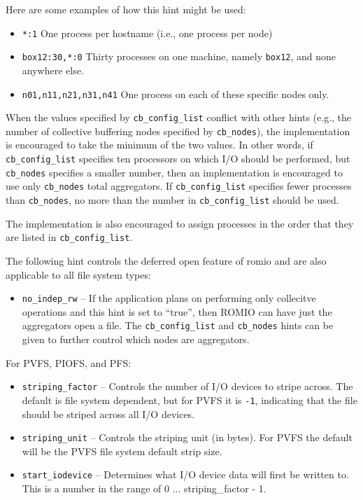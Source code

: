 Here are some examples of how this hint might be used:
\begin{itemize}
\item \texttt{*:1} One process per hostname (i.e., one process per node)
\item \texttt{box12:30,*:0} Thirty processes on one machine, namely
      \texttt{box12}, and none anywhere else.
\item \texttt{n01,n11,n21,n31,n41} One process on each of these specific
      nodes only.
\end{itemize}

When the values specified by \texttt{cb\_config\_list} conflict with
other hints (e.g., the number of collective buffering nodes specified by
\texttt{cb\_nodes}), the implementation is encouraged to take the minimum
of the two values.  In other words, if \texttt{cb\_config\_list} specifies
ten processors on which I/O should be performed, but \texttt{cb\_nodes}
specifies a smaller number, then an implementation is encouraged to use
only \texttt{cb\_nodes} total aggregators. If \texttt{cb\_config\_list}
specifies fewer processes than \texttt{cb\_nodes}, no more than the
number in \texttt{cb\_config\_list} should be used.

The implementation is also encouraged to assign processes in the order
that they are listed in \texttt{cb\_config\_list}.

The following hint controls the deferred open feature of romio and are also
applicable to all file system types: 
\begin{itemize}
\item \texttt{no\_indep\_rw} -- If the application plans on performing only 
   collecitve operations and this hint is set to ``true'', then ROMIO can
   have just the aggregators open a file.   The \texttt{cb\_config\_list} and
   \texttt{cb\_nodes} hints can be given to further control which nodes are
   aggregators.  
\end{itemize}

For PVFS, PIOFS, and PFS:
\begin{itemize}
\item \texttt{striping\_factor} -- Controls the number of I/O devices to
stripe across.  The default is file system dependent, but for PVFS it is
\texttt{-1}, indicating that the file should be striped across all I/O
devices.
\item \texttt{striping\_unit} --  Controls the striping unit (in bytes).
For PVFS the default will be the PVFS file system default strip size.
\item \texttt{start\_iodevice} -- Determines what I/O device data will
first be written to.  This is a number in the range of 0 ...
striping\_factor - 1.
\end{itemize}

